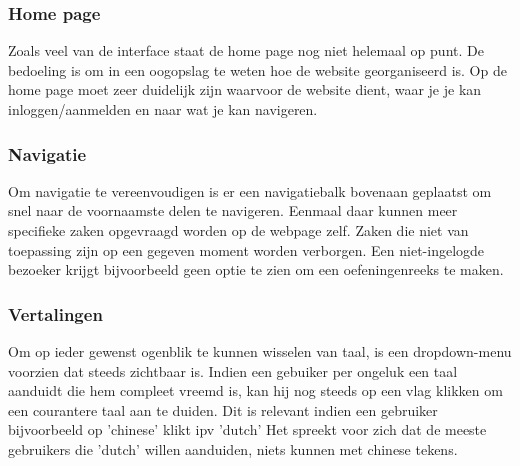 \subsubsection{Home page}
Zoals veel van de interface staat de home page nog niet helemaal op punt. De bedoeling is om
in een oogopslag te weten hoe de website georganiseerd is. Op de home page moet zeer duidelijk
zijn waarvoor de website dient, waar je je kan inloggen/aanmelden en naar wat je kan navigeren.

\subsubsection{Navigatie}
Om navigatie te vereenvoudigen is er een navigatiebalk bovenaan geplaatst om snel naar de voornaamste
delen te navigeren. Eenmaal daar kunnen meer specifieke zaken opgevraagd worden op de webpage zelf.
Zaken die niet van toepassing zijn op een gegeven moment worden verborgen. Een niet-ingelogde bezoeker
krijgt bijvoorbeeld geen optie te zien om een oefeningenreeks te maken.

\subsubsection{Vertalingen}
Om op ieder gewenst ogenblik te kunnen wisselen van taal, is een dropdown-menu voorzien dat steeds zichtbaar is.
Indien een gebuiker per ongeluk een taal aanduidt die hem compleet vreemd is, kan hij nog steeds op een vlag klikken
om een courantere taal aan te duiden. Dit is relevant indien een gebruiker bijvoorbeeld op 'chinese' klikt ipv 'dutch'
Het spreekt voor zich dat de meeste gebruikers die 'dutch' willen aanduiden, niets kunnen met chinese tekens.
